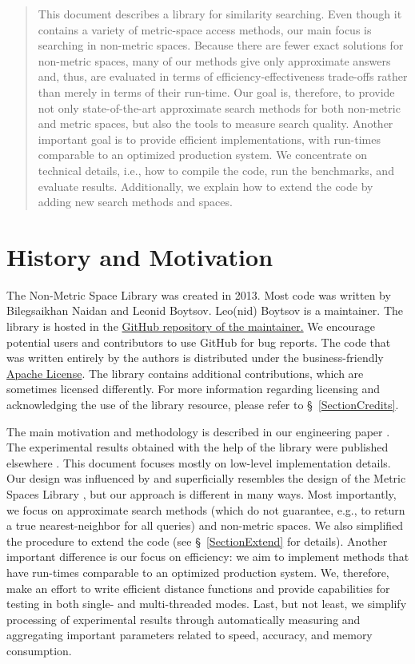 \documentclass[runningheads,a4paper]{llncs}
\begin{document}
\begin{abstract}
This document describes a library for similarity searching.
Even though it contains a variety of metric-space access methods,
our main focus is searching in non-metric spaces.
Because there are fewer exact solutions for non-metric spaces,
many of our methods give only approximate answers and, thus,
are evaluated in terms of efficiency-effectiveness trade-offs
rather than merely in terms of their run-time.
Our goal is, therefore, to provide
not only state-of-the-art approximate search methods for 
both non-metric and metric spaces,
but also the tools to measure search quality.
Another important goal is to provide efficient implementations,
with run-times comparable to an optimized production system. 
We concentrate on technical details, i.e., 
how to compile the code, run the benchmarks, and evaluate results.
Additionally, we explain how to extend the code by adding
new search methods and spaces.
\end{abstract}

\section{History and Motivation}
The Non-Metric Space Library was created in 2013.
Most code was written by Bilegsaikhan Naidan and Leonid Boytsov.
Leo(nid) Boytsov is a maintainer.
The library is hosted in the \href{https://github.com/searchivarius/NonMetricSpaceLib}{GitHub repository of  the maintainer.} 
We encourage potential users and contributors to use GitHub for bug reports.
The code that was written entirely by the authors is distributed under the business-friendly \href{http://apache.org/licenses/LICENSE-2.0}{Apache License}. 
The library contains additional contributions, which are sometimes licensed differently.
For more information regarding licensing and acknowledging the use of the library
resource, please refer to \S~\ref{SectionCredits}.

The main motivation and methodology is described in our engineering paper \cite{Boytsov_and_Bilegsaikhan:sisap2013}.
The experimental results obtained with the help of the library
were published elsewhere \cite{Boytsov_and_Bilegsaikhan:nips2013}.
This document focuses mostly on low-level implementation details. 
Our design was influenced by and superficially resembles the design of the Metric Spaces Library \cite{LibMetricSpace},
but our approach is different in many ways. 
Most importantly, we focus on approximate search methods (which do not guarantee, e.g.,
to return a true nearest-neighbor for all queries) and non-metric spaces.
We also simplified the procedure to extend the code (see \S~\ref{SectionExtend} for details).
Another important difference is our focus on efficiency:
we aim to implement methods that have run-times comparable to an optimized production system. 
We, therefore, make an effort to write efficient distance functions
and provide capabilities for testing in both single- and multi-threaded modes.
Last, but not least, we simplify processing of experimental results
through automatically measuring and aggregating important parameters
related to speed, accuracy, and memory consumption.
\end{document}
